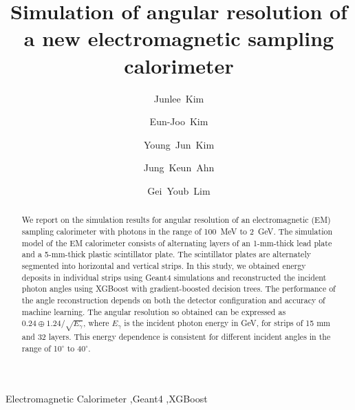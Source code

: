 \documentclass[12pt,times,draftclsnofoot,a4paper]{elsarticle}
\begin{document}
\begin{frontmatter}

\setcounter{page}{0}
\title{Simulation of angular resolution of a new electromagnetic sampling calorimeter}

\author[jbnu]{Junlee~Kim}

\author[jbnu]{Eun-Joo~Kim}

\author[korea]{Young~Jun~Kim}
\author[korea]{Jung~Keun~Ahn}
\author[kek]{Gei~Youb~Lim}

\address[jbnu]{Division of Science Education, Jeonbuk National University, Jeonju 54896, Korea}
\address[korea]{Department of Physics, Korea University, Seoul 02841, Korea}
\address[kek]{Institute of Particle and Nuclear Studies (IPNS), High Energy Accelerator Research Organization (KEK), Tsukuba 305-0801, Japan}


\begin{abstract}
We report on the simulation results for angular resolution of an electromagnetic (EM) sampling calorimeter with photons in the range of 100~MeV to 2~GeV. The simulation model of the EM calorimeter consists of alternating layers of an 1-mm-thick lead plate and a 5-mm-thick plastic scintillator plate. The scintillator plates are alternately segmented into horizontal and vertical strips. In this study, we obtained energy deposits in individual strips using Geant4 simulations and reconstructed the incident photon angles using XGBoost with gradient-boosted decision trees. The performance of the angle reconstruction depends on both the detector configuration and accuracy of machine learning. The angular resolution so obtained can be expressed as $0.24 \oplus 1.24/\sqrt{E_{\gamma}}$, where $E_{\gamma}$ is the incident photon energy in GeV, for strips of 15 mm and 32 layers. This energy dependence is consistent for different incident angles in the range of 10$^{\circ}$ to 40$^{\circ}$.

\end{abstract}
\begin{keyword}
Electromagnetic Calorimeter \sep Geant4 \sep XGBoost
\end{keyword}

\end{frontmatter}
\end{document}
